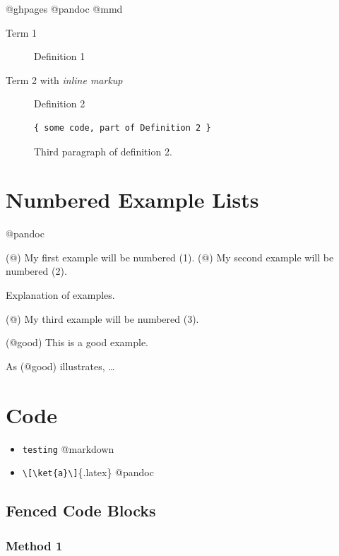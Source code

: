 @ghpages @pandoc @mmd

\begin{description}

\item[Term 1]

Definition 1

\item[Term 2 with \emph{inline markup}]

Definition 2

\begin{verbatim}
{ some code, part of Definition 2 }
\end{verbatim}

Third paragraph of definition 2.
\end{description}

\section{Numbered Example Lists}
\label{numberedexamplelists}

@pandoc

(@) My first example will be numbered (1).
(@) My second example will be numbered (2).

Explanation of examples.

(@) My third example will be numbered (3).

(@good) This is a good example.

As (@good) illustrates, {\ldots}

\section{Code}
\label{code}

\begin{itemize}
\item \texttt{testing} @markdown

\item \texttt{\textbackslash{}[\textbackslash{}ket\{a\}\textbackslash{}]}\{.latex\} @pandoc

\end{itemize}

\subsection{Fenced Code Blocks}
\label{fencedcodeblocks}

\subsubsection{Method 1}
\label{method1}

